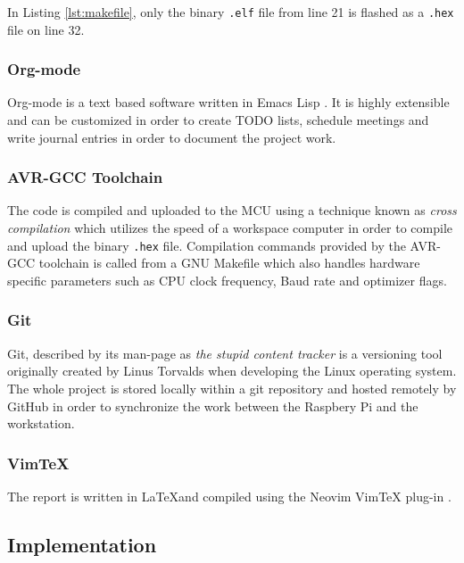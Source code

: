 

In Listing \ref{lst:makefile}, only the binary \verb|.elf| file from line 21 is flashed as a \verb|.hex| file on line 32. 

\subsubsection{Org-mode}%
\label{ssub:org_mode}
Org-mode is a text based software written in Emacs Lisp \cite{OrgMode}. It is highly extensible and can be customized in order to create TODO lists, schedule meetings and write journal entries in order to document the project work.

\subsubsection{AVR-GCC Toolchain}%
\label{ssub:avr_gcc_toolchain}
The code is compiled and uploaded to the MCU using a technique known as \textit{cross compilation} which utilizes the speed of a workspace computer in order to compile and upload the binary \verb|.hex| file. Compilation commands provided by the AVR-GCC toolchain \cite{GCCCompilersAVR} is called from a GNU Makefile which also handles hardware specific parameters such as CPU clock frequency, Baud rate and optimizer flags. 

\subsubsection{Git}%
\label{ssub:git}
Git, described by its man-page as \textit{the stupid content tracker} is a versioning tool originally created by Linus Torvalds \cite{git} when developing the Linux operating system. The whole project is stored locally within a git repository and hosted remotely by GitHub in order to synchronize the work between the Raspbery Pi and the workstation.
\subsubsection{VimTeX}%
\label{ssub:vimtex}
The report is written in \LaTeX and compiled using the Neovim VimTeX plug-in \cite{lervagVimTeX2022}.

\subsection{Implementation}%
\label{sub:implementation}

